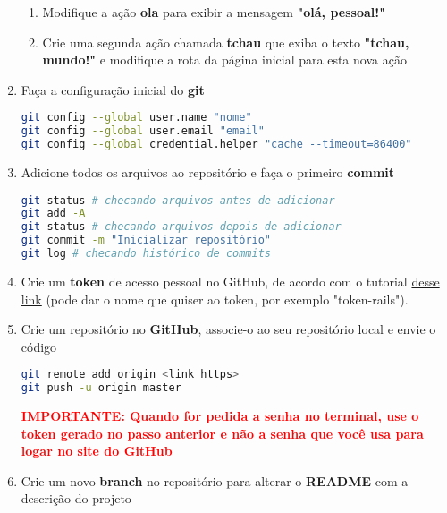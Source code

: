 \documentclass[a4paper,12pt]{article}
\begin{document}
\begin{enumerate}
    \begin{enumerate}
      \item Modifique a ação \textbf{ola} para exibir a mensagem \textbf{"olá, pessoal!"}
      \item Crie uma segunda ação chamada \textbf{tchau} que exiba o texto \textbf{"tchau, mundo!"} e modifique a rota da página inicial para esta nova ação
    \end{enumerate}

  \item Faça a configuração inicial do \textbf{git}

    \begin{lstlisting}[language=Bash]
git config --global user.name "nome"
git config --global user.email "email"
git config --global credential.helper "cache --timeout=86400"
    \end{lstlisting}

  \item Adicione todos os arquivos ao repositório e faça o primeiro \textbf{commit}

    \begin{lstlisting}[language=Bash, commentstyle=\color{gray}]
git status # checando arquivos antes de adicionar
git add -A
git status # checando arquivos depois de adicionar
git commit -m "Inicializar repositório"
git log # checando histórico de commits
    \end{lstlisting}

  \item Crie um \textbf{token} de acesso pessoal no GitHub, de acordo com o tutorial \href{https://help.github.com/pt/github/authenticating-to-github/creating-a-personal-access-token-for-the-command-line}{desse link} (pode dar o nome que quiser ao token, por exemplo "token-rails").

  \item Crie um repositório no \textbf{GitHub}, associe-o ao seu repositório local e envie o código

    \begin{lstlisting}[language=Bash]
git remote add origin <link https>
git push -u origin master
    \end{lstlisting}

  \textcolor{red}{\textbf{IMPORTANTE: Quando for pedida a senha no terminal, use o token gerado no passo anterior e não a senha que você usa para logar no site do GitHub}}

  \item Crie um novo \textbf{branch} no repositório para alterar o \textbf{README} com a descrição do projeto


\end{enumerate}
\end{document}
